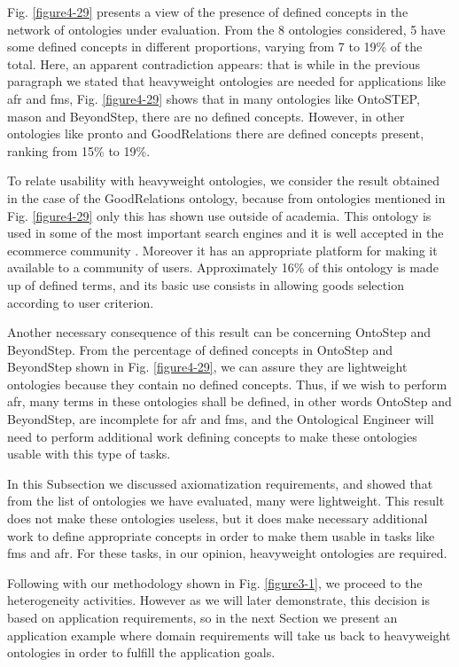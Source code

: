 Fig. \ref{figure4-29} presents a view of the presence of defined concepts in the network of ontologies under evaluation. From the 8 ontologies considered, 5 have some defined concepts in different proportions, varying from 7 to 19\% of the total. Here, an apparent contradiction appears: that is while in the previous paragraph we stated that heavyweight ontologies are needed for applications like \gls{afr} and \gls{fms}, Fig. \ref{figure4-29} shows that in many ontologies like OntoSTEP, \gls{mason} and BeyondStep, there are no defined concepts. However, in other ontologies like \gls{pronto} and GoodRelations there are defined concepts present,  ranking from 15\% to 19\%.

To relate usability with heavyweight ontologies, we consider the result obtained in the case of the GoodRelations ontology, because from ontologies mentioned in Fig. \ref{figure4-29} only this has shown use outside of academia. This ontology is used in some of the most important   search engines and it is well accepted in the ecommerce community \cite{hepp_references_2013}. Moreover it has an appropriate platform for making it available to a community of users. Approximately 16\% of this ontology is made up of defined terms, and its basic use consists in allowing goods selection according to user criterion. 

Another necessary consequence of this result can be concerning OntoStep and BeyondStep. From the percentage of defined concepts in OntoStep and BeyondStep shown in Fig. \ref{figure4-29},  we can assure they are lightweight ontologies because they contain no defined concepts. Thus, if we wish to perform \gls{afr}, many terms in these ontologies shall be defined, in other words OntoStep and BeyondStep, are incomplete for \gls{afr} and \gls{fms}, and the Ontological Engineer will need to perform additional work defining concepts to make these ontologies usable with this type of tasks. 

In this Subsection we discussed axiomatization requirements, and showed that from the list of ontologies we have evaluated, many were lightweight. This result does not make these ontologies useless, but it does make necessary additional work to define appropriate concepts in order to make them usable in tasks like \gls{fms} and \gls{afr}. For these tasks, in our opinion, heavyweight ontologies are required. 

Following with our methodology shown in Fig. \ref{figure3-1}, we proceed to the heterogeneity activities. However as we will later demonstrate, this decision is based on application requirements, so in the next Section we present an application example where domain requirements will take us back to heavyweight ontologies in order to fulfill the application goals.  



